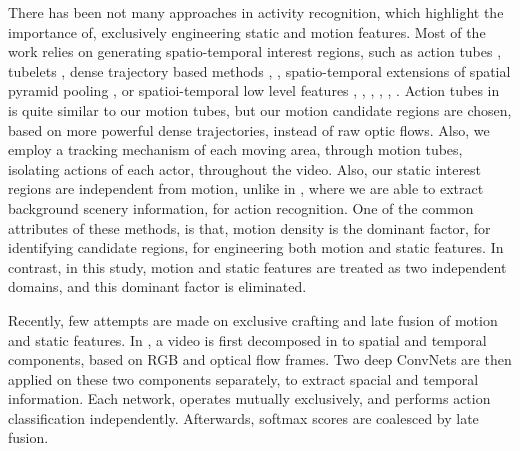 
There has been not many approaches in activity recognition, which highlight the
importance of, exclusively engineering static and motion features. Most of the work
relies on generating spatio-temporal interest regions, such as action tubes \cite{gkioxari2015finding},
tubelets \cite{jain2014action}, dense trajectory based methods \cite{van2015apt}, \cite{wang2015action},
spatio-temporal extensions of spatial pyramid pooling \cite{laptev2008learning},
or spatioi-temporal low level features  \cite{schuldt2004recognizing}, \cite{ke2005efficient}, \cite{shechtman2005space},
\cite{wang2011action}, \cite{klaser2008spatio}, \cite{yu2010real}. Action tubes in \cite{gkioxari2015finding} is quite similar to 
our motion tubes, but our motion candidate regions are chosen, based on more powerful dense trajectories, instead of
raw optic flows. Also, we employ a tracking mechanism of each moving area, through motion tubes, isolating actions 
of each actor, throughout the video. Also, our static interest regions are independent from motion,
unlike in \cite{gkioxari2015finding}, where we are able to extract background scenery information, for 
action recognition. 
One of the common attributes of these methods, is that, motion density is the 
dominant factor, for identifying candidate regions, for engineering both motion and static features. 
In contrast, in this study, motion and static features 
are treated as two independent domains, and this dominant factor is eliminated. 

Recently, few attempts are made on exclusive crafting and late fusion 
of motion and static features. In \cite{simonyan2014two}, a video is first decomposed in to 
spatial and temporal components, based on RGB and optical flow frames.
Two deep ConvNets are then applied on these two components separately, to extract spacial and 
temporal information. Each network, operates mutually exclusively, and performs action classification
independently. Afterwards, softmax scores are coalesced by late fusion. 

